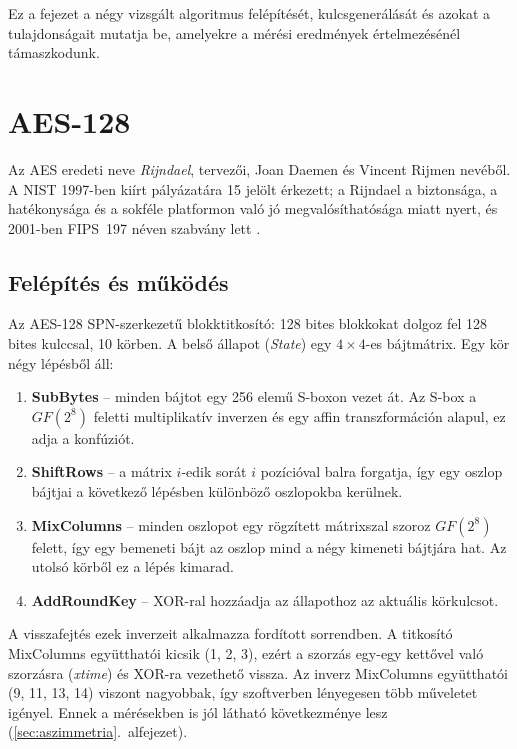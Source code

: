 \documentclass[a4paper,12pt]{report}
\theoremstyle{definition}
\theoremstyle{remark}
\begin{document}
Ez a fejezet a négy vizsgált algoritmus felépítését, kulcsgenerálását és azokat a tulajdonságait mutatja be, amelyekre a mérési eredmények értelmezésénél támaszkodunk.

\section{AES-128}\label{sec:aes}

Az AES eredeti neve \emph{Rijndael}, tervezői, Joan Daemen és Vincent Rijmen nevéből. A NIST 1997-ben kiírt pályázatára 15 jelölt érkezett; a Rijndael a biztonsága, a hatékonysága és a sokféle platformon való jó megvalósíthatósága miatt nyert, és 2001-ben FIPS~197 néven szabvány lett \cite{FIPS197,DaemenRijmen2002}.

\subsection{Felépítés és működés}\label{sec:aes_struktura}

Az AES-128 SPN-szerkezetű blokktitkosító: 128 bites blokkokat dolgoz fel 128 bites kulccsal, 10 körben. A belső állapot (\emph{State}) egy $4 \times 4$-es bájtmátrix. Egy kör négy lépésből áll:

\begin{enumerate}
	\item \textbf{SubBytes} -- minden bájtot egy 256 elemű S-boxon vezet át. Az S-box a $GF(2^8)$ feletti multiplikatív inverzen és egy affin transzformáción alapul, ez adja a konfúziót.
	\item \textbf{ShiftRows} -- a mátrix $i$-edik sorát $i$ pozícióval balra forgatja, így egy oszlop bájtjai a következő lépésben különböző oszlopokba kerülnek.
	\item \textbf{MixColumns} -- minden oszlopot egy rögzített mátrixszal szoroz $GF(2^8)$ felett, így egy bemeneti bájt az oszlop mind a négy kimeneti bájtjára hat. Az utolsó körből ez a lépés kimarad.
	\item \textbf{AddRoundKey} -- XOR-ral hozzáadja az állapothoz az aktuális körkulcsot.
\end{enumerate}

A visszafejtés ezek inverzeit alkalmazza fordított sorrendben. A titkosító MixColumns együtthatói kicsik (1, 2, 3), ezért a szorzás egy-egy kettővel való szorzásra (\emph{xtime}) és XOR-ra vezethető vissza. Az inverz MixColumns együtthatói (9, 11, 13, 14) viszont nagyobbak, így szoftverben lényegesen több műveletet igényel. Ennek a mérésekben is jól látható következménye lesz (\ref{sec:aszimmetria}.~alfejezet).
\end{document}
